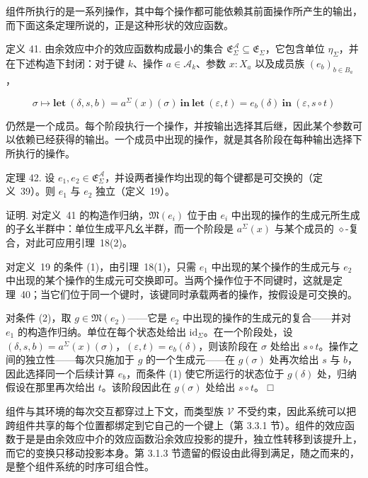 \documentclass[
  10
]{article}
\begin{document}
组件所执行的是一系列操作，其中每个操作都可能依赖其前面操作所产生的输出，而下面这条定理所说的，正是这种形状的效应函数。

定义 41. 由余效应中介的效应函数构成最小的集合 \(\mathfrak { E } _ { \Sigma } ^ { \mathcal { A } } \subseteq \mathfrak { E } _ { \Sigma }\)，它包含单位 \(\eta _ { \Sigma }\)，并在下述构造下封闭：对于键 \(k\)、操作 \(a \in \mathcal { A } _ { k }\)、参数 \(x : X _ { a }\) 以及成员族 \(( e _ { b } ) _ { b \in B _ { a } }\)，

\[
\sigma \mapsto \mathbf { l e t } ~ ( \delta , s , b ) = a ^ { \Sigma } ( x ) ( \sigma ) \ \mathbf { i n } \ \mathbf { l e t } ~ ( \varepsilon , t ) = e _ { b } ( \delta ) \ \mathbf { i n } ~ ( \varepsilon , s \circ t )\tag{36}
\]

仍然是一个成员。每个阶段执行一个操作，并按输出选择其后继，因此某个参数可以依赖已经获得的输出。一个成员中出现的操作，就是其各阶段在每种输出选择下所执行的操作。

定理 42. 设 \(e _ { 1 } , e _ { 2 } \in \mathfrak { E } _ { \Sigma } ^ { \mathcal { A } }\)，并设两者操作均出现的每个键都是可交换的（定义~39）。则 \(e _ { 1 }\) 与 \(e _ { 2 }\) 独立（定义~19）。

证明. 对定义~41 的构造作归纳，\(\mathfrak { M } ( e _ { i } )\) 位于由 \(e _ { i }\) 中出现的操作的生成元所生成的子幺半群中：单位生成平凡幺半群，而一个阶段是 \(a ^ { \Sigma } ( x )\) 与某个成员的 $\diamond$-复合，对此可应用引理~18(2)。

对定义~19 的条件 (1)，由引理~18(1)，只需 \(e _ { 1 }\) 中出现的某个操作的生成元与 \(e _ { 2 }\) 中出现的某个操作的生成元可交换即可。当两个操作位于不同键时，这就是定理~40；当它们位于同一个键时，该键同时承载两者的操作，按假设是可交换的。

对条件 (2)，取 \(g \in \mathfrak { M } ( e _ { 2 } )\)——它是 \(e _ { 2 }\) 中出现的操作的生成元的复合——并对 \(e _ { 1 }\) 的构造作归纳。单位在每个状态处给出 \(\mathrm { i d } _ { \Sigma }\)。在一个阶段处，设 \(( \delta , s , b ) = a ^ { \Sigma } ( x ) ( \sigma )\)，\(( \varepsilon , t ) = e _ { b } ( \delta )\)，则该阶段在 \(\sigma\) 处给出 \(s \circ t\)。操作之间的独立性——每次只施加于 \(g\) 的一个生成元——在 \(g ( \sigma )\) 处再次给出 \(s\) 与 \(b\)，因此选择同一个后续计算 \(e _ { b }\)，而条件 (1) 使它所运行的状态位于 \(g ( \delta )\) 处，归纳假设在那里再次给出 \(t\)。该阶段因此在 \(g ( \sigma )\) 处给出 \(s \circ t\)。 □

组件与其环境的每次交互都穿过上下文，而类型族 \(\mathcal{V}\) 不受约束，因此系统可以把跨组件共享的每个位置都绑定到它自己的一个键上（第 3.3.1 节）。组件的效应函数于是是由余效应中介的效应函数沿余效应投影的提升，独立性转移到该提升上，而它的变换只移动投影本身。第 3.1.3 节遗留的假设由此得到满足，随之而来的，是整个组件系统的时序可组合性。
\end{document}
